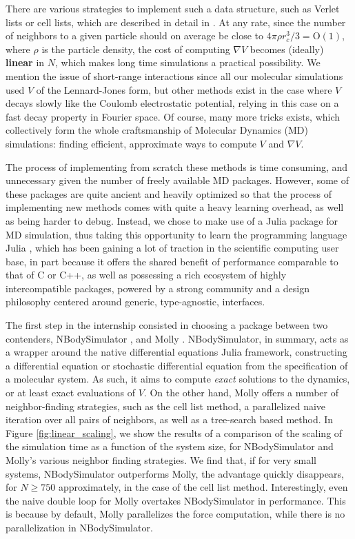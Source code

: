 There are various strategies to implement such a data structure, such as Verlet lists or cell lists, which are described in detail in \cite[Section 5.3]{AT89}.
At any rate, since the number of neighbors to a given particle should on average be close to $4\pi\rho r_c^3/3=\mathrm{O}(1)$, where $\rho$ is the particle density, the cost of computing $\nabla V$ becomes (ideally) \textbf{linear} in $N$,
which makes long time simulations a practical possibility. 
We mention the issue of short-range interactions since all our molecular simulations used $V$ of the Lennard-Jones form, but other methods exist in the case where $V$ decays slowly like the Coulomb electrostatic potential, relying in this case on a fast decay property in Fourier space.
Of course, many more tricks exists, which collectively form the whole craftsmanship of Molecular Dynamics (MD) simulations: finding efficient, approximate ways to compute $V$ and $\nabla V$.

The process of implementing from scratch these methods is time consuming, and unnecessary given the number of freely available MD packages. 
However, some of these packages are quite ancient and heavily optimized so that the process of implementing new methods comes with quite a heavy learning overhead, as well as being harder to debug.
Instead, we chose to make use of a Julia package for MD simulation, thus taking this opportunity to learn the programming language Julia \cite{bezanson2017julia}, which has been gaining a lot of traction in the scientific computing user base, 
in part because it offers the shared benefit of performance comparable to that of C or C++, as well as possessing a rich ecosystem of highly intercompatible packages, powered by a strong community and a design philosophy centered around generic, type-agnostic, interfaces.

The first step in the internship consisted in choosing a package between two contenders, NBodySimulator \cite{NBS}, and Molly \cite{Molly}. 
NBodySimulator, in summary, acts as a wrapper around the native differential equations Julia framework, constructing a differential equation or stochastic differential equation from the specification of a molecular system.
As such, it aims to compute \textit{exact} solutions to the dynamics, or at least exact evaluations of $V$. 
On the other hand, Molly offers a number of neighbor-finding strategies, such as the cell list method, a parallelized naive iteration over all pairs of neighbors, as well as a tree-search based method. 
In Figure \ref{fig:linear_scaling}, we show the results of a comparison of the scaling of the simulation time as a function of the system size, for NBodySimulator and Molly's various neighbor finding strategies.
We find that, if for very small systems, NBodySimulator outperforms Molly, the advantage quickly disappears, for $N \geq 750$ approximately, in the case of the cell list method.
Interestingly, even the naive double loop for Molly overtakes NBodySimulator in performance. This is because by default, Molly parallelizes the force computation, while there is no parallelization in NBodySimulator.

